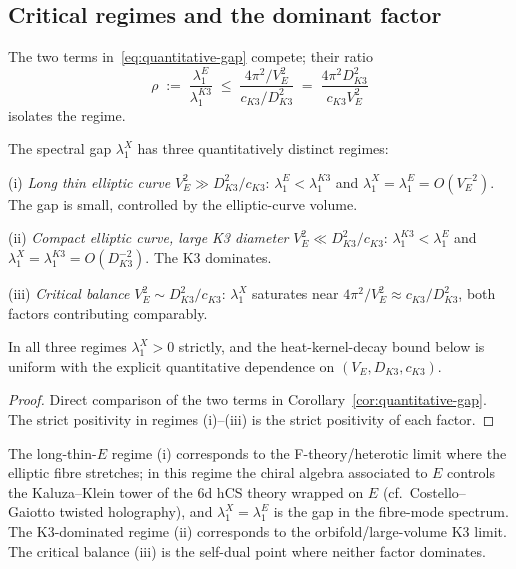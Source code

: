 \subsection{Critical regimes and the dominant factor}
\label{subsec:critical-regimes}

The two terms in~\eqref{eq:quantitative-gap} compete; their ratio
\begin{equation}
\label{eq:critical-ratio}
 \rho \;:=\; \frac{\lambda_1^E}{\lambda_1^{K3}}
 \;\leq\; \frac{4\pi^2 / V_E^2}{c_{K3} / D_{K3}^2}
 \;=\; \frac{4\pi^2 D_{K3}^2}{c_{K3} V_E^2}
\end{equation}
isolates the regime.

\begin{proposition}
\label{prop:three-regimes}
\ClaimStatusProposition{}
The spectral gap $\lambda_1^X$ has three quantitatively distinct
regimes:

\textup{(i) \emph{Long thin elliptic curve}}
$V_E^2 \gg D_{K3}^2 / c_{K3}$: $\lambda_1^E < \lambda_1^{K3}$ and
$\lambda_1^X = \lambda_1^E = O(V_E^{-2})$. The gap is small,
controlled by the elliptic-curve volume.

\textup{(ii) \emph{Compact elliptic curve, large K3 diameter}}
$V_E^2 \ll D_{K3}^2 / c_{K3}$: $\lambda_1^{K3} < \lambda_1^E$ and
$\lambda_1^X = \lambda_1^{K3} = O(D_{K3}^{-2})$. The K3 dominates.

\textup{(iii) \emph{Critical balance}} $V_E^2 \sim D_{K3}^2 / c_{K3}$:
$\lambda_1^X$ saturates near $4\pi^2 / V_E^2 \approx c_{K3} / D_{K3}^2$,
both factors contributing comparably.

In all three regimes $\lambda_1^X > 0$ strictly, and the
heat-kernel-decay bound below is uniform with the explicit
quantitative dependence on $(V_E, D_{K3}, c_{K3})$.
\end{proposition}

\begin{proof}
Direct comparison of the two terms in
Corollary~\ref{cor:quantitative-gap}. The strict positivity in regimes
(i)--(iii) is the strict positivity of each factor.
\end{proof}

\begin{remark}
The long-thin-$E$ regime (i) corresponds to the F-theory/heterotic
limit where the elliptic fibre stretches; in this regime the chiral
algebra associated to $E$ controls the Kaluza--Klein tower of the
6d hCS theory wrapped on $E$ \textup{(}cf.~Costello--Gaiotto twisted
holography\textup{)}, and $\lambda_1^X = \lambda_1^E$ is the gap in
the fibre-mode spectrum. The K3-dominated regime (ii) corresponds to
the orbifold/large-volume K3 limit. The critical balance (iii) is the
self-dual point where neither factor dominates.
\end{remark}

